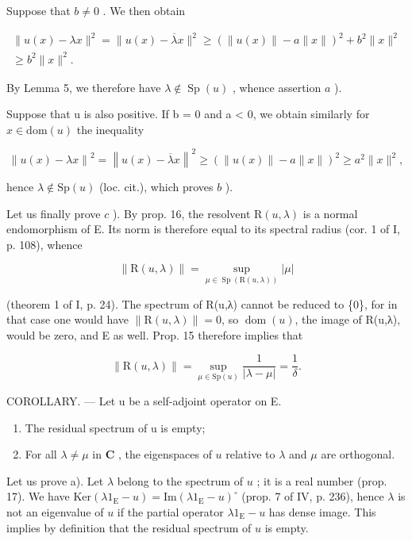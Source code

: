 Suppose that \(b \neq 0\) . We then obtain

\[
\begin{array}{c} \| u (x) - \lambda x \| ^ {2} = \| u (x) - \overline {{\lambda}} x \| ^ {2} \geqslant (\| u (x) \| - a \| x \|) ^ {2} + b ^ {2} \| x \| ^ {2} \\ \geqslant b ^ {2} \| x \| ^ {2}. \end{array}
\]

By Lemma 5, we therefore have \(\lambda \notin \operatorname{Sp}(u)\) , whence assertion \(a\) ).

Suppose that u is also positive. If b = 0 and a \textless{} 0, we obtain similarly for \(x \in \text{dom}(u)\) the inequality

\[
\left\| u (x) - \lambda x \right\| ^ {2} = \left\| u (x) - \overline {{\lambda}} x \right\| ^ {2} \geqslant \left(\left\| u (x) \right\| - a \| x \|\right) ^ {2} \geqslant a ^ {2} \| x \| ^ {2},
\]

hence \(\lambda\notin\mathrm{Sp}(u)\) (loc. cit.), which proves \(b\) ).

Let us finally prove \(c\) ). By prop. 16, the resolvent \(\mathrm{R}(u,\lambda)\) is a normal endomorphism of E. Its norm is therefore equal to its spectral radius (cor. 1 of I, p. 108), whence

\[
\| \mathrm{R} (u, \lambda) \| = \sup _ {\mu \in \operatorname{Sp} (\mathrm{R} (u, \lambda))} | \mu |
\]

(theorem 1 of I, p. 24). The spectrum of R(u,λ) cannot be reduced to \{0\}, for in that case one would have \(\| \mathrm{R}(u,\lambda)\| = 0\), so \(\operatorname{dom}(u)\), the image of R(u,λ), would be zero, and E as well. Prop. 15 therefore implies that

\[
\| \mathrm{R} (u, \lambda) \| = \sup _ {\mu \in \mathrm{Sp} (u)} \frac {1}{| \lambda - \mu |} = \frac {1}{\delta}.
\]

COROLLARY. --- Let u be a self-adjoint operator on E.

\begin{enumerate}
\def\labelenumi{\alph{enumi})}
\item
  The residual spectrum of u is empty;
\item
  For all \(\lambda \neq \mu\) in \(\mathbf{C}\) , the eigenspaces of \(u\) relative to \(\lambda\) and \(\mu\) are orthogonal.
\end{enumerate}

Let us prove a). Let \(\lambda\) belong to the spectrum of \(u\) ; it is a real number (prop. 17). We have \(\mathrm{Ker}(\lambda 1_{\mathrm{E}} - u) = \mathrm{Im}(\lambda 1_{\mathrm{E}} - u)^{\circ}\) (prop. 7 of IV, p. 236), hence \(\lambda\) is not an eigenvalue of \(u\) if the partial operator \(\lambda 1_{\mathrm{E}} - u\) has dense image. This implies by definition that the residual spectrum of \(u\) is empty.

